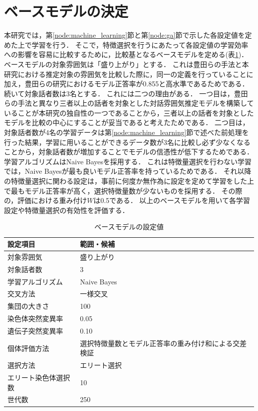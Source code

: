 

\section{ベースモデルの決定\label{node:base_model}}

本研究では，第\ref{node:machine_learning}節と第\ref{node:ga}節で示した各設定値を定めた上で学習を行う．
そこで，特徴選択を行うにあたって各設定値の学習効率への影響を容易に比較するために，比較基となるベースモデルを定める(表\ref{tab:base_model_setting})．
ベースモデルの対象雰囲気は「盛り上がり」とする．
これは豊田らの手法と本研究における推定対象の雰囲気を比較した際に，同一の定義を行っていることに加え，豊田らの研究におけるモデル正答率が0.855と高水準であるためである．
続いて対象話者数は3名とする．
これには二つの理由がある．
一つ目は，豊田らの手法と異なり三者以上の話者を対象とした対話雰囲気推定モデルを構築していることが本研究の独自性の一つであることから，三者以上の話者を対象としたモデルを比較の中心にすることが妥当であると考えたためである．
二つ目は，対象話者数が4名の学習データは第\ref{node:machine_learning}節で述べた前処理を行った結果，学習に用いることができるデータ数が3名に比較し必ず少なくなることから，対象話者数が増加することでモデルの信憑性が低下するためである．
学習アルゴリズムはNaive Bayesを採用する．
これは特徴量選択を行わない学習では，Naive Bayesが最も良いモデル正答率を持っているためである．
それ以降の特徴量選択に関わる設定は，事前に何度か無作為に設定を定めて学習をした上で最もモデル正答率が高く，選択特徴量数が少ないものを採用する．
その際の，評価における重み付け$W$は0.5である．
以上のベースモデルを用いて各学習設定や特徴量選択の有効性を評価する．

\begin{table}[t]
    \caption{ベースモデルの設定値}
    \centering
    \begin{tabular}{ll}
        \hline
        設定項目 & 範囲・候補 \\ \hline\hline
        対象雰囲気 & 盛り上がり \\ \hline
        対象話者数 & 3 \\ \hline
        学習アルゴリズム & Naive Bayes \\ \hline
        交叉方法 & 一様交叉 \\ \hline
        集団の大きさ & 100 \\ \hline
        染色体突然変異率 & 0.05 \\ \hline
        遺伝子突然変異率 & 0.10 \\ \hline
        個体評価方法 & 選択特徴量数とモデル正答率の重み付け和による交差検証 \\ \hline
        選択方法 & エリート選択 \\ \hline
        エリート染色体選択数 & 10 \\ \hline
        世代数 & 250 \\ \hline
    \end{tabular}
    \label{tab:base_model_setting}
\end{table}

